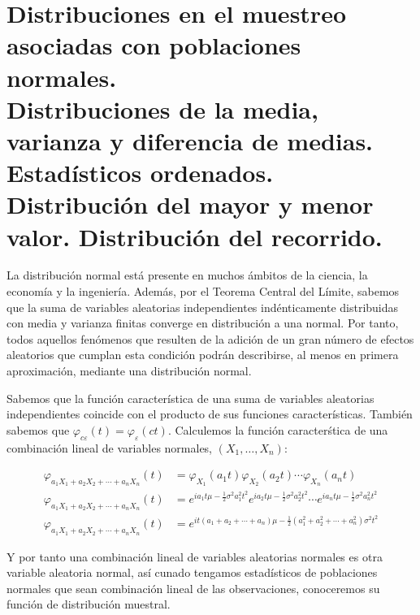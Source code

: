 \chapter[Distribuciones en el muestreo asociadas con poblaciones normales.]{Distribuciones en el muestreo asociadas con poblaciones normales. \\
\normalsize Distribuciones de la media, varianza y diferencia de medias. Estad\'isticos ordenados. Distribuci\'on del mayor y menor valor. Distribuci\'on del recorrido.}


La distribuci\'on normal est\'a presente en muchos \'ambitos de la ciencia, la econom\'ia y la ingenier\'ia. Adem\'as, por el Teorema Central del L\'imite, sabemos que la suma de variables aleatorias independientes ind\'enticamente distribuidas con media y varianza finitas converge en distribuci\'on a una normal. Por tanto, todos aquellos fen\'omenos que resulten de la adici\'on de un gran n\'umero de efectos aleatorios que cumplan esta condici\'on podr\'an describirse, al menos en primera aproximaci\'on, mediante una distribuci\'on normal.


Sabemos que la funci\'on caracter\'istica de una suma de variables aleatorias independientes coincide con el producto de sus funciones caracter\'isticas. Tambi\'en sabemos que $\varphi_{c\varepsilon}(t)=\varphi_{\varepsilon}(ct)$. Calculemos la funci\'on caracter\'stica de una combinaci\'on lineal de variables normales, $(X_1,\ldots,X_n)$:

\begin{align*}
  \varphi_{a_1X_1+a_2X_2+\cdots+a_nX_n}(t) & = \varphi_{X_1}(a_1t)\varphi_{X_2}(a_2t)\cdots\varphi_{X_n}(a_nt)  \\
  \varphi_{a_1X_1+a_2X_2+\cdots+a_nX_n}(t) & = e^{ia_1t\mu-\frac{1}{2}\sigma^2a_1^2t^2}e^{ia_2t\mu-\frac{1}{2}\sigma^2a_2^2t^2} \cdots e^{ia_nt\mu-\frac{1}{2}\sigma^2a_n^2t^2} \\
  \varphi_{a_1X_1+a_2X_2+\cdots+a_nX_n}(t) & = e^{it(a_1+a_2+\cdots+a_n)\mu-\frac{1}{2}(a_1^2+a_2^2+\cdots+a_n^2)\sigma^2t^2} 
\end{align*}

Y por tanto una combinaci\'on lineal de variables aleatorias normales es otra variable aleatoria normal, as\'i cunado tengamos estad\'isticos de poblaciones normales que sean combinaci\'on lineal de las observaciones, conoceremos su funci\'on de distribuci\'on muestral.

